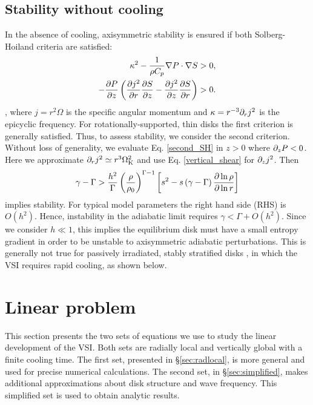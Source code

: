 \subsection{Stability without cooling}\label{solberg}
In the absence of cooling, axisymmetric stability is ensured
if both Solberg-Hoiland criteria  are satisfied:
\begin{align}
  \kappa^2 - \frac{1}{\rho C_p}\nabla P \cdot \nabla S &> 0,\\
  -\frac{\partial P}{\partial z}\left(\frac{\partial j^2}{\partial r}\frac{\partial S}{ \partial z} -
    \frac{\partial j^2}{\partial z}\frac{\partial S}{\partial r} \right)&>0. \label{second_SH} 
\end{align}
\citep{tassoul78}, where $j=r^2\Omega$ is the specific angular
momentum and $\kappa = r^{-3} \partial_r j^2 $ is the epicyclic frequency.  For rotationally-supported, thin disks %
the first criterion is generally satisfied. 
Thus, to assess stability, we consider the second
criterion. 
Without loss of generality, we evaluate Eq. \ref{second_SH} in $z>0$
where $\partial_zP<0$. Here we approximate $\partial_r j^2\simeq r^3\Omega_{\rm K}^2$ and
use Eq. \ref{vertical_shear} for $\partial_zj^2$. Then 
\begin{align}\label{solberg2}
  \gamma - \Gamma > \frac{ h^2}{\Gamma}
  \left(\frac{\rho}{\rho_0}\right)^{\Gamma-1} \left[s^2
    -s\left(\gamma-\Gamma\right)\frac{\partial\ln{\rho}}{\partial\ln{r}} \right]
\end{align} 
implies stability. For typical model parameters the right hand
side (RHS) is $O( h^2)$. Hence, instability in the adiabatic limit  
requires $\gamma < \Gamma + O( h^2)$. Since we consider
$ h\ll1$, this implies the equilibrium disk must have a small
entropy gradient in order to be unstable to axisymmetric adiabatic
perturbations. This is generally not true for passively irradiated, stably
stratified disks \citep{chiang97}, in which the VSI requires rapid
cooling, as shown below. 

\section{Linear problem}\label{linear} 
This section presents the two sets of equations we use to study the
linear development of the VSI.  Both sets are radially local and vertically global 
with a finite cooling time.
The first set, presented in \S\ref{sec:radlocal}, is more general and used 
for precise numerical calculations.  The second set, in \S\ref{sec:simplified}, makes
additional approximations  about disk structure and wave frequency.  This simplified
set is used to obtain analytic results.


